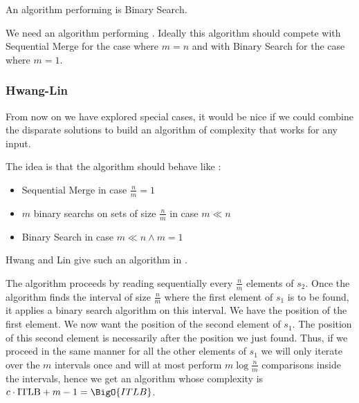 An algorithm performing  is Binary Search.






We need an algorithm performing . Ideally this algorithm should compete with Sequential Merge for the case where $m = n$ and with Binary Search for the case where $m = 1$.



\subsubsection{Hwang-Lin}

From now on we have explored special cases, it would be nice if we could combine the disparate solutions to build an algorithm of complexity  that works for any input.

The idea is that the algorithm should behave like :

\begin{itemize}
\item Sequential Merge in case $\frac{n}{m} = 1$
\item $m$ binary searchs on sets of size $\frac{n}{m}$ in case $m \ll n$
\item Binary Search in case $m \ll n \land m = 1$
\end{itemize}

Hwang and Lin give such an algorithm in \cite{DBLP:journals/siamcomp/HwangL72}.

The algorithm proceeds by reading sequentially every $\frac{n}{m}$ elements of $s_2$. Once the algorithm finds the interval of size $\frac{n}{m}$ where the first element of $s_1$ is to be found, it applies a binary search algorithm on this interval. We have the position of the first element.
We now want the position of the second element of $s_1$. The position of this second element is necessarily after the position we just found. Thus, if we proceed in the same manner for all the other elements of $s_1$ we will only iterate over the $m$ intervals once and will at most perform $m \log\frac{n}{m}$ comparisons inside the intervals, hence we get an algorithm whose complexity is $c \cdot \text{ITLB} + m - 1 = \BigO{ITLB}$.


